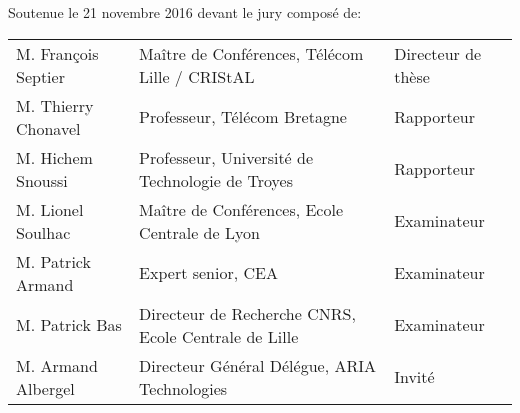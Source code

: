 \begin{flushleft}

Soutenue le 21 novembre 2016 devant le jury composé de:\\[2ex]



\addtolength{\textwidth}{-1cm}
\begin{tabular}{lll}
 M. François {\sc Septier} & Maître de Conférences, Télécom Lille / CRIStAL & Directeur de thèse\\
 M. Thierry {\sc Chonavel} & Professeur, Télécom Bretagne & Rapporteur \\
 M. Hichem {\sc Snoussi} & Professeur, Université de Technologie de Troyes &  Rapporteur  \\
 M. Lionel {\sc Soulhac} & Maître de Conférences, Ecole Centrale de Lyon & Examinateur  \\
 M. Patrick {\sc Armand} & Expert senior, CEA &  Examinateur  \\
 M. Patrick {\sc Bas} & Directeur de Recherche CNRS, Ecole Centrale de Lille &  Examinateur  \\
 M. Armand {\sc Albergel} & Directeur Général Délégue, ARIA Technologies &  Invité  \\
\end{tabular}
\addtolength{\textwidth}{1cm}

\end{flushleft}


\pagebreak